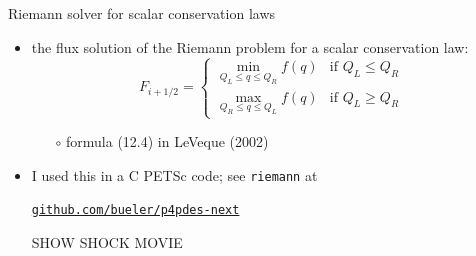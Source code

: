 \documentclass[10pt,dvipsnames,usepdftitle=false,
hyperref={pdftitle = {Finite volume methods},
    pdfauthor = {Ed Bueler}}]{beamer}
\begin{document}
\begin{frame}{Riemann solver for scalar conservation laws}

\begin{itemize}
\item the flux solution of the Riemann problem for a scalar conservation law:
    $$F_{i+1/2} = \begin{cases} {\displaystyle \min_{Q_L \le q \le Q_R} f(q)} & \text{if } Q_L \le Q_R \\ {\displaystyle \max_{Q_R \le q \le Q_L} f(q)} & \text{if } Q_L \ge Q_R \end{cases}$$

    \begin{itemize}
    \item[$\circ$] formula (12.4) in LeVeque (2002)
    \end{itemize}
\item I used this in a C PETSc code; see \texttt{riemann} at
\begin{center}
\href{https://github.com/bueler/p4pdes-next}{\texttt{github.com/bueler/p4pdes-next}}
\end{center}

\vspace{10mm}
\begin{center}
\alert{SHOW SHOCK MOVIE}
\end{center}
\end{itemize}

\end{frame}
\end{document}
